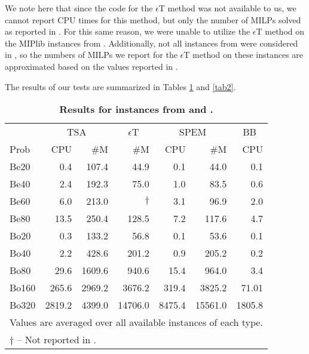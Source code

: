 \documentclass[12pt]{article}
\begin{document}
We note here that since the code for the $\epsilon$T method was not available to us, we cannot report CPU times for this method, but only the number of MILPs solved as reported in \citep{soylu2016exact}. For this same reason, we were unable to utilize the $\epsilon$T method on the MIPlib instances from \citep{adelgren2016}. Additionally, not all instances from \citep{belotti2012biobjective} were considered in \citep{soylu2016exact}, so the numbers of MILPs we report for the $\epsilon$T method on these instances are approximated based on the values reported in \citep{soylu2016exact}.

The results of our tests are summarized in Tables \ref{tab1} and \ref{tab2}.%
\begin{table}[h!]
\scriptsize
\caption{\textbf{Results for instances from \citep{belotti2012biobjective} and \citep{boland2015criterion}.}}\label{tab1}
\begin{tabular}{lrrrrrr}
& \multicolumn{2}{c}{TSA} & \multicolumn{1}{c}{$\epsilon$T} & \multicolumn{2}{c}{SPEM} & \multicolumn{1}{c}{BB}\\
\cline{2-3}
\cline{4-4}
\cline{5-6}
\cline{7-7}
Prob & CPU & \#M & \#M & CPU & \#M & CPU\\
\hline
\hline
Be20 & 0.4 & 107.4&	44.9 &0.1 &	44.0 &	0.1\\
Be40 & 2.4 & 192.3&  75.0   &	1.0 &	83.5 &	0.6\\
Be60 & 6.0 & 213.0& $\dagger$  &	3.1 &	96.9 &	2.0\\
Be80 & 13.5 &	250.4&      128.5    &	7.2 &	117.6& 4.7\\
\hline
Bo20 & 0.3&	133.2&	56.8& 0.1&	53.6&	0.1\\
Bo40 & 2.2&	428.6&	201.2& 0.9 &	205.2&	0.2\\
Bo80 & 29.6 &	1609.6&	940.6 & 15.4&	964.0&	3.4\\
Bo160 & 265.6&	2969.2&	3676.2& 319.4&	3825.2&71.01\\
Bo320 & 2819.2&	4399.0 & 14706.0 & 8475.4&	15561.0 &	1805.8\\
\hline
\multicolumn{7}{l}{\scriptsize Values are averaged over all available instances of each type.}\\
\multicolumn{7}{l}{\scriptsize $\dagger$ -- Not reported in \citep{soylu2016exact}.}
\end{tabular}
\end{table}%
\end{document}
